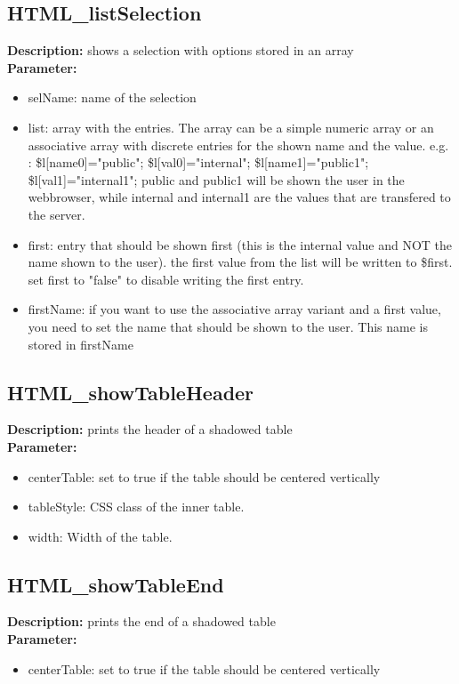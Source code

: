 \subsection{HTML\_listSelection}
\textbf{Description:} shows a selection with options stored in an array\\
\textbf{Parameter:}
\begin{itemize}
\item selName: name of the selection
\item list: array with the entries. The array can be a simple numeric array or an associative array with discrete entries for the shown name and the value. e.g. : \$l[name0]="public"; \$l[val0]="internal"; \$l[name1]="public1"; \$l[val1]="internal1"; public and public1 will be shown the user in the webbrowser, while internal and internal1 are the values that are transfered to the server.
\item first: entry that should be shown first (this is the internal value and NOT the name shown to the user). the first value from the list will be written to \$first. set first to "false" to disable writing the first entry.
\item firstName: if you want to use the associative array variant and a first value, you need to set the name that should be shown to the user. This name is stored in firstName
\end{itemize}

\subsection{HTML\_showTableHeader}
\textbf{Description:} prints the header of a shadowed table\\
\textbf{Parameter:}
\begin{itemize}
\item centerTable: set to true if the table should be centered vertically
\item tableStyle: CSS class of the inner table.
\item width: Width of the table.
\end{itemize}

\subsection{HTML\_showTableEnd}
\textbf{Description:} prints the end of a shadowed table\\
\textbf{Parameter:}
\begin{itemize}
\item centerTable: set to true if the table should be centered vertically
\end{itemize}

